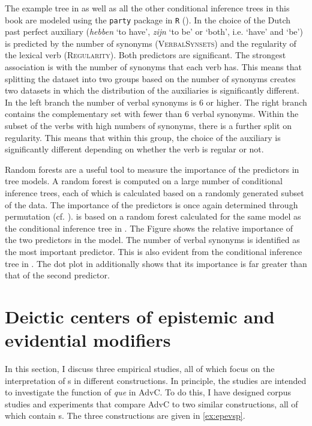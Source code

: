The example tree  in  as well as all the other conditional inference trees in this book are modeled using the \verb|party| package in \verb|R| (\citealt{Hothorn2022}). In  the choice of the Dutch past perfect auxiliary (\textit{hebben} `to have', \textit{zijn} `to be' or `both', i.e. 
 `have' and `be') is predicted by the number of synonyms (\textsc{VerbalSynsets}) and the regularity of the lexical verb (\textsc{Regularity}). Both predictors are significant. The strongest association is with the number of  synonyms that each verb has. This means that splitting the dataset into two groups based on the number of synonyms creates two datasets in which the distribution of the auxiliaries is  significantly different. In the left branch the number of verbal synonyms is 6 or higher. The right branch contains the complementary set with fewer than 6 verbal synonyms. Within the subset of the verbs with high numbers of synonyms, there is a further split on regularity. This  means that within this group, the choice of the auxiliary is significantly different depending on whether the verb is regular or not. 
 
 Random forests  are a useful tool to measure the importance of the predictors in tree models. A random forest is computed on a large number  of conditional inference trees, each of which is calculated based on a randomly generated subset of the data. The importance of the predictors is once again determined through permutation (cf. \citealt{Breiman2001}).  is based on a random forest calculated for the same model as the conditional inference tree in . The Figure shows the relative importance of the two predictors in the model. The number of verbal synonyms is  identified as the most important  predictor.  This is also evident from the conditional inference tree in . The dot plot in  additionally shows that its importance is far greater than that of the second predictor.

\clearpage\section{Deictic centers of epistemic and evidential modifiers}\label{sec:expdeic}
In this section, I discuss three empirical studies,  all of which focus on the interpretation of s in different constructions.   In principle, the studies are intended to investigate the function of \textit{que} in AdvC. To do this, I have designed corpus studies and experiments that compare AdvC to two similar constructions,  all of which contain s. The three constructions are given in \eqref{ex:epevsp}.


